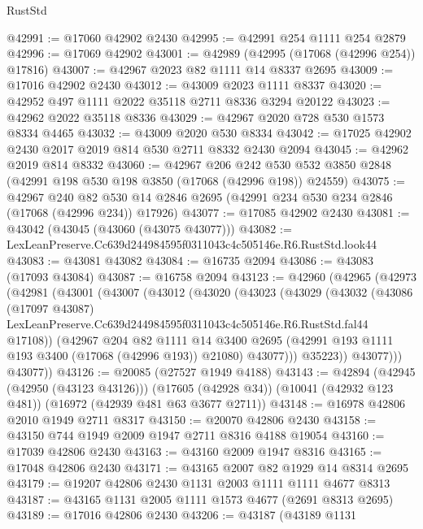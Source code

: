 \begin{lexlean}{RustStd}
\begin{coremodule}
@42991 := @17060 @42902 @2430
@42995 := @42991 @254 @1111 @254 @2879
@42996 := @17069 @42902
@43001 := @42989 (@42995 (@17068 (@42996 @254)) @17816)
@43007 := @42967 @2023 @82 @1111 @14 @8337 @2695
@43009 := @17016 @42902 @2430
@43012 := @43009 @2023 @1111 @8337
@43020 := @42952 @497 @1111 @2022 @35118 @2711 @8336 @3294 @20122
@43023 := @42962 @2022 @35118 @8336
@43029 := @42967 @2020 @728 @530 @1573 @8334 @4465
@43032 := @43009 @2020 @530 @8334
@43042 := @17025 @42902 @2430 @2017 @2019 @814 @530 @2711 @8332 @2430 @2094
@43045 := @42962 @2019 @814 @8332
@43060 := @42967
    @206
    @242
    @530
    @532
    @3850
    @2848
    (@42991 @198 @530 @198 @3850 (@17068 (@42996 @198)) @24559)
@43075 := @42967
    @240
    @82
    @530
    @14
    @2846
    @2695
    (@42991 @234 @530 @234 @2846 (@17068 (@42996 @234)) @17926)
@43077 := @17085 @42902 @2430
@43081 := @43042 (@43045 (@43060 (@43075 @43077)))
@43082 := LexLeanPreserve.Cc639d244984595f0311043c4c505146e.R6.RustStd.look44
@43083 := @43081 @43082
@43084 := @16735 @2094
@43086 := @43083 (@17093 @43084)
@43087 := @16758 @2094
@43123 := @42960
    (@42965
      (@42973
        (@42981
          (@43001
            (@43007
              (@43012
                (@43020
                  (@43023
                    (@43029
                      (@43032
                        (@43086
                          (@17097 @43087)
                          LexLeanPreserve.Cc639d244984595f0311043c4c505146e.R6.RustStd.fal44
                          @17108))
                      (@42967
                        @204
                        @82
                        @1111
                        @14
                        @3400
                        @2695
                        (@42991 @193 @1111 @193 @3400 (@17068 (@42996 @193)) @21080)
                        @43077)))
                  @35223))
              @43077)))
        @43077))
@43126 := @20085 (@27527 @1949 @4188)
@43143 := @42894
    (@42945 (@42950 (@43123 @43126)))
    (@17605 (@42928 @34))
    (@10041 (@42932 @123 @481))
    (@16972 (@42939 @481 @63 @3677 @2711))
@43148 := @16978 @42806 @2010 @1949 @2711 @8317
@43150 := @20070 @42806 @2430
@43158 := @43150 @744 @1949 @2009 @1947 @2711 @8316 @4188 @19054
@43160 := @17039 @42806 @2430
@43163 := @43160 @2009 @1947 @8316
@43165 := @17048 @42806 @2430
@43171 := @43165 @2007 @82 @1929 @14 @8314 @2695
@43179 := @19207 @42806 @2430 @1131 @2003 @1111 @1111 @4677 @8313
@43187 := @43165 @1131 @2005 @1111 @1573 @4677 (@2691 @8313 @2695)
@43189 := @17016 @42806 @2430
@43206 := @43187
    (@43189
      @1131

\end{coremodule}
\end{lexlean}
